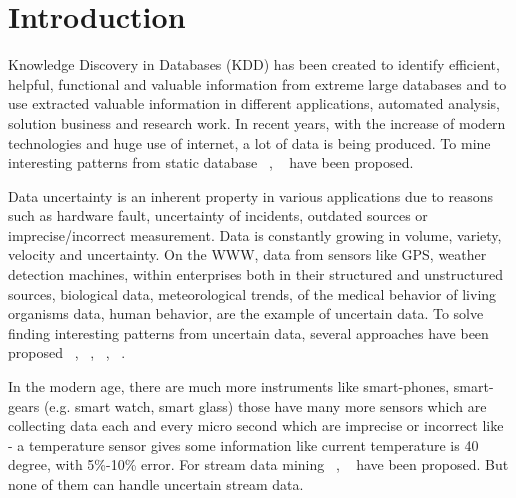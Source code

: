 \documentclass[conference]{IEEEtran}
\begin{document}
\IEEEpeerreviewmaketitle

\section{Introduction}

Knowledge Discovery in Databases (KDD) has been created to identify efficient, helpful, functional and valuable information from extreme large databases and to use extracted valuable information in different applications, automated analysis, solution business and research work. In recent years, with the increase of modern technologies and huge use of internet, a lot of data is being produced. To mine interesting patterns from static database ~\cite{DBLP:conf/vldb/AgrawalS94}, ~\cite{DBLP:journals/datamine/HanPYM04} have been proposed.

Data uncertainty is an inherent property in various applications due to reasons such as hardware fault, uncertainty of incidents, outdated sources or imprecise/incorrect measurement. Data is constantly growing in volume, variety, velocity and uncertainty. On the WWW, data from sensors like GPS, weather detection machines, within enterprises both in their structured and unstructured sources, biological data, meteorological trends, of the medical behavior of living organisms data, human behavior, are the example of uncertain data. To solve finding interesting patterns from uncertain data, several approaches have been proposed ~\cite{DBLP:journals/tkde/ZhaoYN14}, ~\cite{DBLP:conf/kdd/AggarwalLWW09}, ~\cite{DBLP:conf/pakdd/LeungT13}, ~\cite{DBLP:conf/dasfaa/LeungT12}.

In the modern age, there are much more instruments like smart-phones, smart-gears (e.g. smart watch, smart glass) those have many more sensors which are collecting data each and every micro second which are imprecise or incorrect like - a temperature sensor gives some information like current temperature is 40 degree, with 5\%-10\% error. For stream data mining ~\cite{DBLP:conf/icdm/LeungK06}, ~\cite{DBLP:journals/vldb/CormodeH10} have been proposed. But none of them can handle uncertain stream data.
\end{document}
